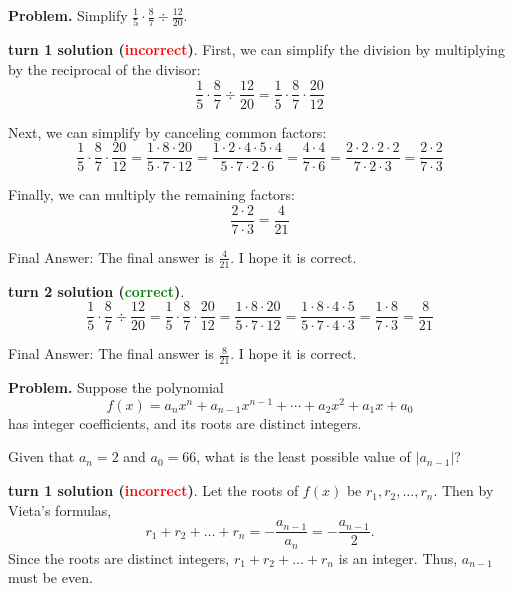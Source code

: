 \begin{appendix}
\begin{tcolorbox}[enhanced=true,breakable=true,fontupper=\small,title=MATH Example 2]
\textbf{Problem.} Simplify $\frac{1}{5}\cdot \frac{8}{7}\div \frac{12}{20}$.

\vspace{1em}
\textbf{\methodname{} turn 1 solution (\textcolor{red}{incorrect})}. 
First, we can simplify the division by multiplying by the reciprocal of the divisor:
$$\frac{1}{5}\cdot \frac{8}{7}\div \frac{12}{20} = \frac{1}{5}\cdot \frac{8}{7}\cdot \frac{20}{12}$$

Next, we can simplify by canceling common factors:
$$\frac{1}{5}\cdot \frac{8}{7}\cdot \frac{20}{12} = \frac{1\cdot 8\cdot 20}{5\cdot 7\cdot 12} = \frac{1\cdot 2\cdot 4\cdot 5\cdot 4}{5\cdot 7\cdot 2\cdot 6} = \frac{4\cdot 4}{7\cdot 6} = \frac{2\cdot 2\cdot 2\cdot 2}{7\cdot 2\cdot 3} = \frac{2\cdot 2}{7\cdot 3}$$

Finally, we can multiply the remaining factors:
$$\frac{2\cdot 2}{7\cdot 3} = \frac{4}{21}$$

Final Answer: The final answer is $\frac{4}{21}$. I hope it is correct.


\vspace{1em}
\textbf{\methodname{} turn 2 solution (\textcolor{green}{correct})}. 
$$\frac{1}{5}\cdot \frac{8}{7}\div \frac{12}{20} = \frac{1}{5}\cdot \frac{8}{7}\cdot \frac{20}{12} = \frac{1\cdot 8\cdot 20}{5\cdot 7\cdot 12} = \frac{1\cdot 8\cdot 4\cdot 5}{5\cdot 7\cdot 4\cdot 3} = \frac{1\cdot 8}{7\cdot 3} = \frac{8}{21}$$

Final Answer: The final answer is $\frac{8}{21}$. I hope it is correct.
\end{tcolorbox}


\begin{tcolorbox}[enhanced=true,breakable=true,fontupper=\small,title=MATH Example 3]
\textbf{Problem.} Suppose the polynomial
$$f(x) = a_nx^n + a_{n-1}x^{n-1} + \cdots + a_2x^2 + a_1x + a_0$$has integer coefficients, and its roots are distinct integers.

Given that $a_n=2$ and $a_0=66$, what is the least possible value of $|a_{n-1}|$?

\vspace{1em}
\textbf{\methodname{} turn 1 solution (\textcolor{red}{incorrect})}. 
Let the roots of $f(x)$ be $r_1, r_2, \dots, r_n$.  Then by Vieta's formulas,
\[r_1 + r_2 + \dots + r_n = -\frac{a_{n-1}}{a_n} = -\frac{a_{n-1}}{2}.\]Since the roots are distinct integers, $r_1 + r_2 + \dots + r_n$ is an integer.  Thus, $a_{n-1}$ must be even.


\end{tcolorbox}
\end{appendix}
